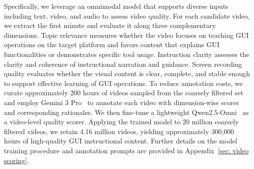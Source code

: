 \documentclass{article}
\theoremstyle{plain}
\theoremstyle{definition}
\theoremstyle{remark}
\begin{document}

Specifically, we leverage an omnimodal model that supports diverse inputs including text, video, and audio to assess video quality. For each candidate video, we extract the first minute and evaluate it along three complementary dimensions. Topic relevance measures whether the video focuses on teaching GUI operations on the target platform and favors content that explains GUI functionalities or demonstrates specific tool usage. Instruction clarity assesses the clarity and coherence of instructional narration and guidance. Screen recording quality evaluates whether the visual content is clear, complete, and stable enough to support effective learning of GUI operations.
To reduce annotation costs, we curate approximately 200 hours of videos sampled from the coarsely filtered set and employ Gemini 3 Pro~\citep{comanici2025gemini} to annotate each video with dimension-wise scores and corresponding rationales. We then fine-tune a lightweight Qwen2.5-Omni~\citep{xu2025qwen2} as a video-level quality scorer. Applying the trained model to 20 million coarsely filtered videos, we retain 4.16 million videos, yielding approximately 300,000 hours of high-quality GUI instructional content. Further details on the model training procedure and annotation prompts are provided in Appendix~\ref{sec: video scoring}.


\end{document}
